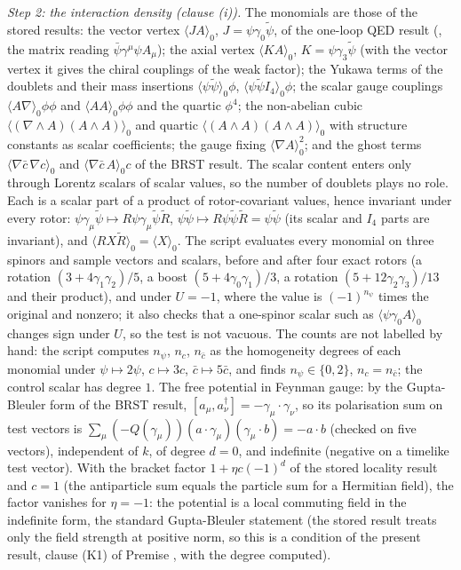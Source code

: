 \emph{Step 2: the interaction density (clause (i)).} The monomials are those of the stored results: the vector vertex $\langle J A\rangle_{0}$, $J = \psi\gamma_{0}\tilde\psi$, of the one-loop QED result (, the matrix reading $\bar\psi\gamma^{\mu}\psi A_{\mu}$); the axial vertex $\langle K A\rangle_{0}$, $K = \psi\gamma_{3}\tilde\psi$ (with the vector vertex it gives the chiral couplings of the weak factor); the Yukawa terms of the doublets and their mass insertions $\langle\psi\tilde\psi\rangle_{0}\phi$, $\langle\psi\tilde\psi I_{4}\rangle_{0}\phi$; the scalar gauge couplings $\langle A\nabla\rangle_{0}\phi\phi$ and $\langle AA\rangle_{0}\phi\phi$ and the quartic $\phi^{4}$; the non-abelian cubic $\langle(\nabla \wedge A)(A \wedge A)\rangle_{0}$ and quartic $\langle(A \wedge A)(A \wedge A)\rangle_{0}$ with structure constants as scalar coefficients; the gauge fixing $\langle\nabla A\rangle_{0}^{2}$; and the ghost terms $\langle\nabla\bar c\,\nabla c\rangle_{0}$ and $\langle\nabla\bar c\,A\rangle_{0}c$ of the BRST result. The scalar content enters only through Lorentz scalars of scalar values, so the number of doublets plays no role. Each is a scalar part of a product of rotor-covariant values, hence invariant under every rotor: $\psi\gamma_{\mu}\tilde\psi \mapsto R\psi\gamma_{\mu}\tilde\psi\tilde R$, $\psi\tilde\psi \mapsto R\psi\tilde\psi\tilde R = \psi\tilde\psi$ (its scalar and $I_{4}$ parts are invariant), and $\langle R X\tilde R\rangle_{0} = \langle X\rangle_{0}$. The script evaluates every monomial on three spinors and sample vectors and scalars, before and after four exact rotors (a rotation $(3 + 4\gamma_{1}\gamma_{2})/5$, a boost $(5 + 4\gamma_{0}\gamma_{1})/3$, a rotation $(5 + 12\gamma_{2}\gamma_{3})/13$ and their product), and under $U = -1$, where the value is $(-1)^{n_{\psi}}$ times the original and nonzero; it also checks that a one-spinor scalar such as $\langle\psi\gamma_{0}A\rangle_{0}$ changes sign under $U$, so the test is not vacuous. The counts are not labelled by hand: the script computes $n_{\psi}$, $n_{c}$, $n_{\bar c}$ as the homogeneity degrees of each monomial under $\psi \mapsto 2\psi$, $c \mapsto 3c$, $\bar c \mapsto 5\bar c$, and finds $n_{\psi} \in \{0, 2\}$, $n_{c} = n_{\bar c}$; the control scalar has degree $1$. The free potential in Feynman gauge: by the Gupta-Bleuler form of the BRST result, $[a_{\mu}, a_{\nu}^{\dagger}] = -\gamma_{\mu}\cdot\gamma_{\nu}$, so its polarisation sum on test vectors is $\sum_{\mu}(-Q(\gamma_{\mu}))(a\cdot\gamma_{\mu})(\gamma_{\mu}\cdot b) = -a\cdot b$ (checked on five vectors), independent of $k$, of degree $d = 0$, and indefinite (negative on a timelike test vector). With the bracket factor $1 + \eta c(-1)^{d}$ of the stored locality result and $c = 1$ (the antiparticle sum equals the particle sum for a Hermitian field), the factor vanishes for $\eta = -1$: the potential is a local commuting field in the indefinite form, the standard Gupta-Bleuler statement (the stored result treats only the field strength at positive norm, so this is a condition of the present result, clause (K1) of Premise , with the degree computed).

